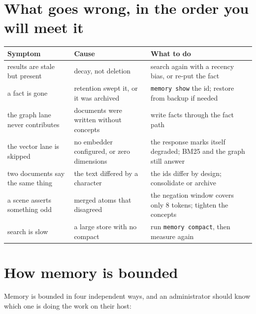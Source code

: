 \section{What goes wrong, in the order you will meet it}

\begin{longtable}{@{}p{}p{}p{}@{}}
  \toprule
  \textbf{Symptom} & \textbf{Cause} & \textbf{What to do} \\
  \midrule
  \endhead
  results are stale but present & decay, not deletion & search again with a recency bias, or re-put the fact \\
  a fact is gone & retention swept it, or it was archived & \texttt{memory show} the id; restore from backup if needed \\
  the graph lane never contributes & documents were written without concepts & write facts through the fact path \\
  the vector lane is skipped & no embedder configured, or zero dimensions & the response marks itself degraded; BM25 and the graph still answer \\
  two documents say the same thing & the text differed by a character & the ids differ by design; consolidate or archive \\
  a scene asserts something odd & merged atoms that disagreed & the negation window covers only 8 tokens; tighten the concepts \\
  search is slow & a large store with no compact & run \texttt{memory compact}, then measure again \\
  \bottomrule
\end{longtable}

\section{How memory is bounded}

Memory is bounded in four independent ways, and an administrator should know which one is doing
the work on their host:

